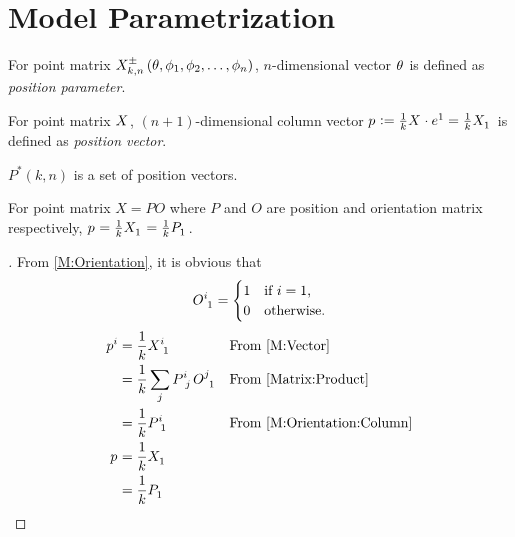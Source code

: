 \documentclass[stu, babel, american, biblatex, a4paper, leqno, draftall]{apa7}
\begin{document}
\section{Model Parametrization}
\begin{definition}\label{M:Parameter}
    For point matrix $\tensor{X^\pm_{k,n}\left(\theta,\phi_1,\phi_2,\dots,\phi_n\right)}{}$,
    $n$-dimensional vector $\tensor{\theta}{}$
    is defined as \textit{position parameter}.
\end{definition}
\begin{definition}\label{M:Vector}
    For point matrix $\tensor{X}{}$,
    $\left(n+1\right)$-dimensional column vector $\tensor{p}{}\defeq \frac{1}{k} \tensor{X}{}\cdot\tensor{e}{^1}=\frac{1}{k} \tensor{X}{_1}$
    is defined as \textit{position vector}.
\end{definition}
\begin{definition}\label{M:Vector:Set}
    $P^\ast\left(k,n\right)$ is a set of position vectors.
\end{definition}
\begin{lemma}\label{M:Vector:Position}
    For point matrix $X=PO$
    where $P$ and $O$ are position and orientation matrix respectively,
    $\tensor{p}{}=\frac{1}{k}\tensor{X}{_1}=\frac{1}{k}\tensor{P}{_1}$.
\end{lemma}
\begin{proof}[]
    From \cref{M:Orientation}, it is obvious that
    \begin{equation}\label{M:Orientation:Column}
        \tensor{O}{^i_1} =
        \begin{cases}
            1 & \text{if $i=1$,}  \\
            0 & \text{otherwise.} \\
        \end{cases}
    \end{equation}
    \begin{align*}
        \tensor{p}{^i}
         & = \frac{1}{k}\tensor{X}{^i_1}                         &  & \text{From \cref{M:Vector}}       \\
         & = \frac{1}{k}\sum_j{\tensor{P}{^i_j}\tensor{O}{^j_1}} &  & \text{From \cref{Matrix:Product}} \\
         & = \frac{1}{k}\tensor{P}{^i_1}                         &  & \text{From \cref{M:Orientation:Column}}    \\
        \tensor{p}{}
         & = \frac{1}{k}\tensor{X}{_1}                                                                        \\
         & = \frac{1}{k}\tensor{P}{_1}                           &  & \qedhere
    \end{align*}
\end{proof}
\end{document}
